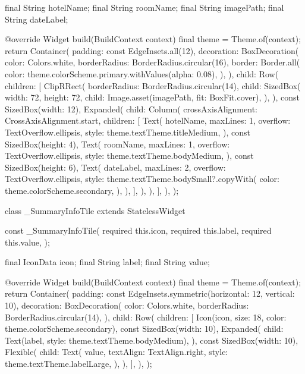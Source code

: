 \documentclass[11pt,a4paper]{article}
\begin{document}
\begin{codeblock}
{  final String hotelName;
  final String roomName;
  final String imagePath;
  final String dateLabel;

  @override
  Widget build(BuildContext context) {
    final theme = Theme.of(context);
    return Container(
      padding: const EdgeInsets.all(12),
      decoration: BoxDecoration(
        color: Colors.white,
        borderRadius: BorderRadius.circular(16),
        border: Border.all(
          color: theme.colorScheme.primary.withValues(alpha: 0.08),
        ),
      ),
      child: Row(
        children: [
          ClipRRect(
            borderRadius: BorderRadius.circular(14),
            child: SizedBox(
              width: 72,
              height: 72,
              child: Image.asset(imagePath, fit: BoxFit.cover),
            ),
          ),
          const SizedBox(width: 12),
          Expanded(
            child: Column(
              crossAxisAlignment: CrossAxisAlignment.start,
              children: [
                Text(
                  hotelName,
                  maxLines: 1,
                  overflow: TextOverflow.ellipsis,
                  style: theme.textTheme.titleMedium,
                ),
                const SizedBox(height: 4),
                Text(
                  roomName,
                  maxLines: 1,
                  overflow: TextOverflow.ellipsis,
                  style: theme.textTheme.bodyMedium,
                ),
                const SizedBox(height: 6),
                Text(
                  dateLabel,
                  maxLines: 2,
                  overflow: TextOverflow.ellipsis,
                  style: theme.textTheme.bodySmall?.copyWith(
                    color: theme.colorScheme.secondary,
                  ),
                ),
              ],
            ),
          ),
        ],
      ),
    );
  }
}

class _SummaryInfoTile extends StatelessWidget {
  const _SummaryInfoTile({
    required this.icon,
    required this.label,
    required this.value,
  });

  final IconData icon;
  final String label;
  final String value;

  @override
  Widget build(BuildContext context) {
    final theme = Theme.of(context);
    return Container(
      padding: const EdgeInsets.symmetric(horizontal: 12, vertical: 10),
      decoration: BoxDecoration(
        color: Colors.white,
        borderRadius: BorderRadius.circular(14),
      ),
      child: Row(
        children: [
          Icon(icon, size: 18, color: theme.colorScheme.secondary),
          const SizedBox(width: 10),
          Expanded(
            child: Text(label, style: theme.textTheme.bodyMedium),
          ),
          const SizedBox(width: 10),
          Flexible(
            child: Text(
              value,
              textAlign: TextAlign.right,
              style: theme.textTheme.labelLarge,
            ),
          ),
        ],
      ),
    );
  }
}


\end{codeblock}
\end{document}
